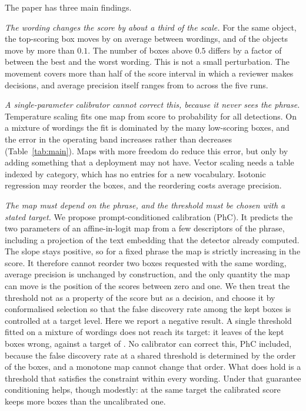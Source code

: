The paper has three main findings.

\emph{The wording changes the score by about a third of the scale.} For the same object, the
top-scoring box moves by \SPREADPTS{} on average between wordings, and \SPREADFRAC{} of the
objects move by more than $0.1$. The number of boxes above $0.5$ differs by a factor of
\BIGRATIO{} between the best and the worst wording. This is not a small perturbation. The
movement covers more than half of the score interval in which a reviewer makes decisions,
and average precision itself ranges from \APMIN{} to \APMAX{} across the five runs.

\emph{A single-parameter calibrator cannot correct this, because it never sees the phrase.}
Temperature scaling fits one map from score to probability for all detections. On a mixture
of wordings the fit is dominated by the many low-scoring boxes, and the error in the operating
band increases rather than decreases (Table~\ref{tab:main}). Maps with more freedom do reduce
this error, but only by adding something that a deployment may not have. Vector scaling needs a
table indexed by category, which has no entries for a new vocabulary. Isotonic regression may
reorder the boxes, and the reordering costs average precision.

\emph{The map must depend on the phrase, and the threshold must be chosen with a stated
target.} We propose prompt-conditioned calibration (PhC). It predicts the two parameters of
an affine-in-logit map from a few descriptors of the phrase, including a projection of the
text embedding that the detector already computed. The slope stays positive, so for a fixed
phrase the map is strictly increasing in the score. It therefore cannot reorder two boxes
requested with the same wording, average precision is unchanged by construction, and the only
quantity the map can move is the position of the scores between zero and one. We then treat
the threshold not as a property of the score but as a decision, and choose it by
conformalised selection so that the false discovery rate among the kept boxes is controlled
at a target level. Here we report a negative result. A single threshold fitted on a mixture
of wordings does not reach its target: it leaves \FDRWORST{} of the kept boxes wrong, against
a target of \ALPHAPCT. No calibrator can correct this, PhC included, because the false
discovery rate at a shared threshold is determined by the order of the boxes, and a monotone
map cannot change that order. What does hold is a threshold that satisfies the constraint
within every wording. Under that guarantee conditioning helps, though modestly: at the same
target the calibrated score keeps \WCGAIN{} more boxes than the uncalibrated one.

